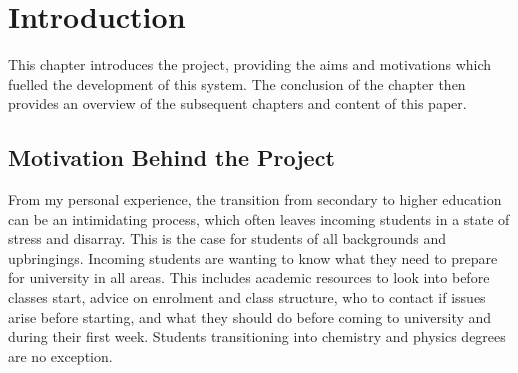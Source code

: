 \documentclass{l4proj}
\begin{document}

\acknowledgements

\tableofcontents

%
%
%
%
%
%
%
%
\chapter{Introduction} \label{Intro}


This chapter introduces the project,  providing the aims and motivations which fuelled the development of this system. The conclusion of the chapter then provides an overview of the subsequent chapters and content of this paper.

\section{Motivation Behind the Project}
From my personal experience,  the transition from secondary to higher education can be an intimidating process,  which often leaves incoming students in a state of stress and disarray. This is the case for students of all backgrounds and upbringings. Incoming students are wanting to know what they need to prepare for university in all areas. This includes academic resources to look into before classes start,  advice on enrolment and class structure,  who to contact if issues arise before starting,  and what they should do before coming to university and during their first week. Students transitioning into chemistry and physics degrees are no exception. 
\end{document}

